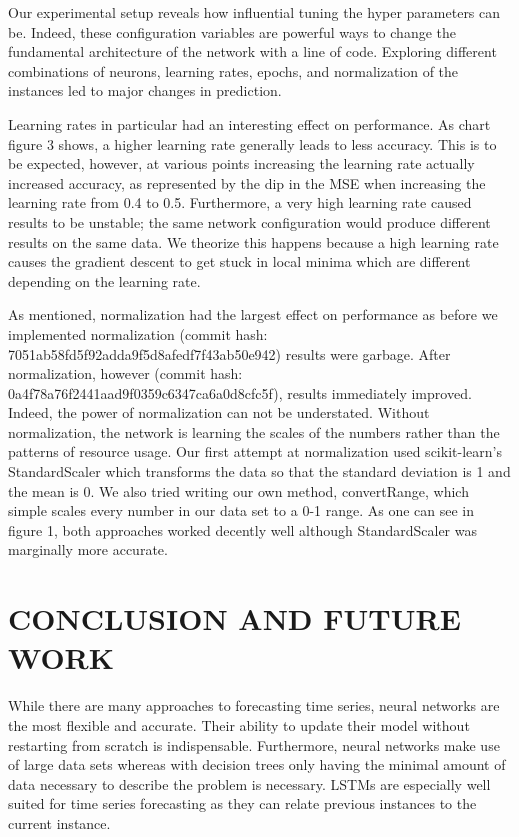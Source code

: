 \documentclass[letterpaper, 11 pt, conference]{ieeeconf}  %
\begin{document}
Our experimental setup reveals how influential tuning the hyper parameters can be. Indeed, these configuration variables are powerful ways to change the fundamental architecture of the network with a line of code. Exploring different combinations of neurons, learning rates, epochs, and normalization of the instances led to major changes in prediction. 

Learning rates in particular had an interesting effect on performance. As chart figure 3 shows, a higher learning rate generally leads to less accuracy. This is to be expected, however, at various points increasing the learning rate actually increased accuracy, as represented by the dip in the MSE when increasing the learning rate from 0.4 to 0.5. Furthermore, a very high learning rate caused results to be unstable; the same network configuration would produce different results on the same data. We theorize this happens because a high learning rate causes the gradient descent to get stuck in local minima which are different depending on the learning rate.

As mentioned, normalization had the largest effect on performance as before we implemented normalization (commit hash: 7051ab58fd5f92adda9f5d8afedf7f43ab50e942) results were garbage. After normalization, however (commit hash: 0a4f78a76f2441aad9f0359c6347ca6a0d8cfc5f), results immediately improved. Indeed, the power of normalization can not be understated. Without normalization, the network is learning the scales of the numbers rather than the patterns of resource usage. Our first attempt at normalization used scikit-learn’s StandardScaler which transforms the data so that the standard deviation is 1 and the mean is 0. We also tried writing our own method, convertRange, which simple scales every number in our data set to a 0-1 range. As one can see in figure 1, both approaches worked decently well although StandardScaler was marginally more accurate.




\section{CONCLUSION AND FUTURE WORK}

While there are many approaches to forecasting time series, neural networks are the most flexible and accurate. Their ability to update their model without restarting from scratch is indispensable. Furthermore, neural networks make use of large data sets whereas with decision trees only having the minimal amount of data necessary to describe the problem is necessary. LSTMs are especially well suited for time series forecasting as they can relate previous instances to the current instance.
\end{document}
